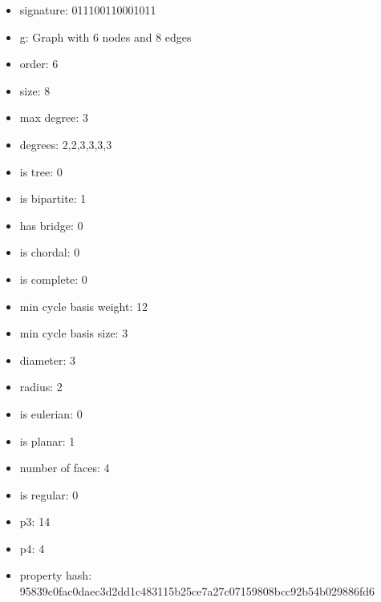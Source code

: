 \begin{itemize}
\item signature: 011100110001011
\item g: Graph with 6 nodes and 8 edges
\item order: 6
\item size: 8
\item max degree: 3
\item degrees: 2,2,3,3,3,3
\item is tree: 0
\item is bipartite: 1
\item has bridge: 0
\item is chordal: 0
\item is complete: 0
\item min cycle basis weight: 12
\item min cycle basis size: 3
\item diameter: 3
\item radius: 2
\item is eulerian: 0
\item is planar: 1
\item number of faces: 4
\item is regular: 0
\item p3: 14
\item p4: 4
\item property hash: 95839c0fac0daec3d2dd1c483115b25ce7a27c07159808bcc92b54b029886fd6
\end{itemize}
\newpage
\begin{figure}
\end{figure}
